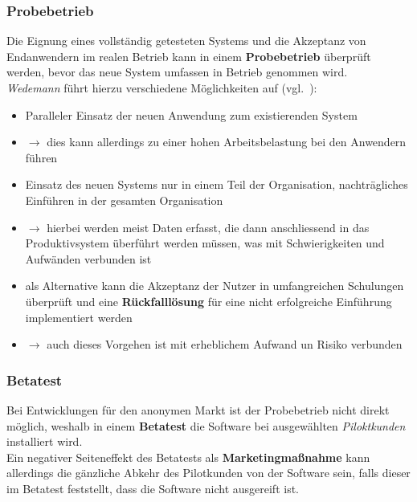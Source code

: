 \subsubsection*{Probebetrieb}
Die Eignung eines vollständig getesteten Systems und die Akzeptanz von Endanwendern im realen Betrieb kann in einem \textbf{Probebetrieb} überprüft werden, bevor das neue System umfassen in Betrieb genommen wird.\\
\textit{Wedemann} führt hierzu verschiedene Möglichkeiten auf (vgl.~\cite[65]{Wed09c}):

\begin{itemize}
    \item Paralleler Einsatz der neuen Anwendung zum existierenden System
    \item[]$\rightarrow$ dies kann allerdings zu einer hohen Arbeitsbelastung bei den Anwendern führen
    \item Einsatz des neuen Systems nur in einem Teil der Organisation, nachträgliches Einführen in der gesamten Organisation
    \item[] $\rightarrow$ hierbei werden meist Daten erfasst, die dann anschliessend in das Produktivsystem überführt werden müssen, was mit Schwierigkeiten und Aufwänden verbunden ist
    \item als Alternative kann die Akzeptanz der Nutzer in umfangreichen Schulungen überprüft und eine \textbf{Rückfalllösung} für eine nicht erfolgreiche Einführung implementiert werden
    \item[]$\rightarrow$ auch dieses Vorgehen ist mit erheblichem Aufwand un Risiko verbunden
\end{itemize}

\subsubsection*{Betatest}
Bei Entwicklungen für den anonymen Markt ist der Probebetrieb nicht direkt möglich, weshalb in einem \textbf{Betatest} die Software bei ausgewählten \textit{Piloktkunden} installiert wird.\\
Ein negativer Seiteneffekt des Betatests als \textbf{Marketingmaßnahme} kann allerdings die gänzliche Abkehr des Pilotkunden von der Software sein, falls dieser im Betatest feststellt, dass die Software nicht ausgereift ist.